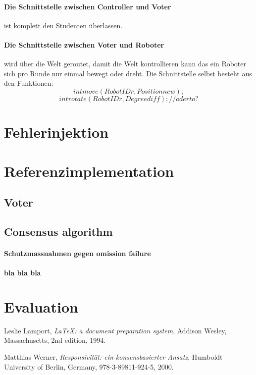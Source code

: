 \documentclass[
    12pt,
    bibliography=totoc,
    ngerman
]{scrartcl}
\begin{document}
\paragraph{Die Schnittstelle zwischen Controller und Voter} ist komplett den Studenten {\"{u}}berlassen.

\paragraph{Die Schnittstelle zwischen Voter und Roboter} wird {\"{u}}ber die Welt geroutet, damit die Welt kontrollieren kann das ein
Roboter sich pro Runde nur einmal bewegt oder dreht. Die Schnittstelle selbst besteht aus den Funktionen:
$$ int move(RobotID r, Position new); $$
$$ int rotate(RobotID r, Degree diff); // oder to? $$ 


\clearpage
\section{Fehlerinjektion}

\clearpage
\section{Referenzimplementation}
\subsection{Voter}
\subsection{Consensus algorithm}
\paragraph{Schutzmassnahmen gegen omission failure}
\paragraph{bla bla bla}


\clearpage
\section{Evaluation}


\clearpage
\begin{thebibliography}{9}

  Leslie Lamport,
  \emph{\LaTeX: a document preparation system},
  Addison Wesley, Massachusetts,
  2nd edition,
  1994.
  
  Matthias Werner,
  \emph{Responsivit{\"{a}}t: ein konsensbasierter Ansatz},
  Humboldt University of Berlin, Germany,
  978-3-89811-924-5,
  2000.
   
\end{thebibliography}
\end{document}

